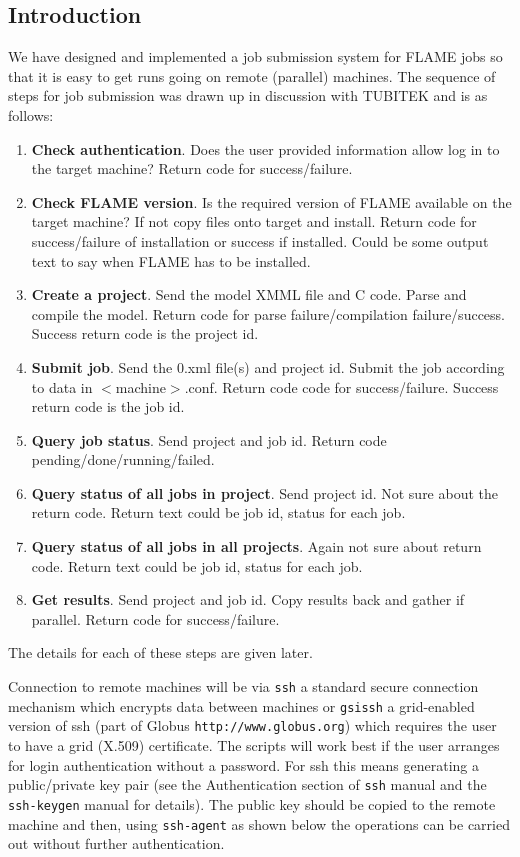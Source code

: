 \subsection{Introduction}

We have designed and implemented a job submission system for FLAME jobs so that it is easy to get runs going on remote (parallel) machines. The sequence of steps for job submission was drawn up in discussion with TUBITEK and is as follows:

\begin{enumerate}
	\item \textbf{Check authentication}. Does the user provided information allow log in to the target machine? Return code for success/failure.
    \item \textbf{Check FLAME version}. Is the required version of FLAME available on the target machine? If not copy files onto target and install. Return code for success/failure of installation or success if installed. Could be some output text to say when FLAME has to be installed.
    \item \textbf{Create a project}. Send the model XMML file and C code. Parse and compile the model. Return code for parse failure/compilation failure/success. Success return code is the project id.
    \item \textbf{Submit job}. Send the 0.xml file(s) and project id. Submit the job according to data in $<$machine$>$.conf. Return code code for success/failure. Success return code is the job id.
    \item \textbf{Query job status}. Send project and job id. Return code pending/done/running/failed.
    \item \textbf{Query status of all jobs in project}. Send project id. Not sure about the return code. Return text could be {job id, status} for each job.
    \item \textbf{Query status of all jobs in all projects}. Again not sure about return code. Return text could be {job id, status} for each job.
    \item \textbf{Get results}. Send project and job id. Copy results back and gather if parallel. Return code for success/failure. 
\end{enumerate}

The details for each of these steps are given later.

Connection to remote machines will be via \texttt{ssh} a standard secure connection mechanism which encrypts data between machines or \texttt{gsissh} a grid-enabled version of ssh (part of Globus \verb+http://www.globus.org+) which requires the user to have a grid (X.509) certificate. The scripts will work best if the user arranges for login authentication without a password. For ssh this means generating a public/private key pair (see the Authentication section of \texttt{ssh} manual and the \texttt{ssh-keygen} manual for details). The public key should be copied to the remote machine and then, using \texttt{ssh-agent} as shown below the operations can be carried out without further authentication.

